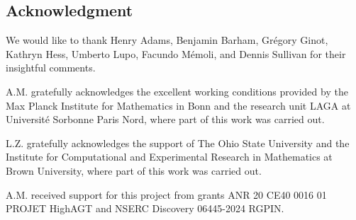 
\subsection*{Acknowledgment}

We would like to thank Henry Adams, Benjamin Barham, Gr\'egory Ginot, Kathryn Hess, Umberto Lupo, Facundo M\'emoli, and Dennis Sullivan for their insightful comments.

A.M. gratefully acknowledges the excellent working conditions provided by the Max Planck Institute for Mathematics in Bonn and the research unit LAGA at Université Sorbonne Paris Nord, where part of this work was carried out.

L.Z. gratefully acknowledges the support of The Ohio State University and the Institute for Computational and Experimental Research in Mathematics at Brown University, where part of this work was carried out.

A.M. received support for this project from grants ANR 20 CE40 0016 01 PROJET HighAGT and NSERC Discovery 06445-2024 RGPIN.